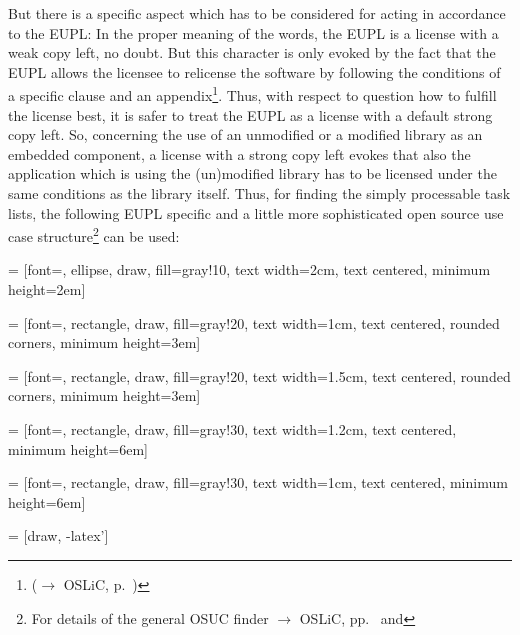 But there is a specific aspect which has to be considered for acting in
accordance to the EUPL: In the proper meaning of the words, the EUPL is a
license with a weak copy left, no doubt. But this character is only evoked by
the fact that the EUPL allows the licensee to relicense the software by
following the conditions of a specific clause and an
appendix\footnote{($\rightarrow$ OSLiC, p.\
\pageref{sec:ProtectingPowerOfEupl})}. Thus, with respect to question how to
fulfill the license best, it is safer to treat the EUPL as a license with a
default strong copy left. So, concerning the use of an unmodified or a modified
library as an embedded component, a license with a strong copy left evokes that
also the application which is using the (un)modified library has to be licensed
under the same conditions as the library itself. Thus, for finding the simply
processable task lists, the following EUPL specific and a little more
sophisticated open source use case structure\footnote{For details of the general
OSUC finder $\rightarrow$ OSLiC, pp.\ \pageref{OsucTokens} and
\pageref{OsucDefinitionTree}} can be used:
 
 
 
 = [font=\scriptsize, ellipse, draw, fill=gray!10, 
    text width=2cm, text centered, minimum height=2em]

 = [font=\tiny, rectangle, draw, fill=gray!20, 
    text width=1cm, text centered, rounded corners, minimum height=3em]

 = [font=\tiny, rectangle, draw, fill=gray!20, 
    text width=1.5cm, text centered, rounded corners, minimum height=3em]
    
 = [font=\tiny, rectangle, draw, fill=gray!30, 
    text width=1.2cm, text centered, minimum height=6em]

 = [font=\tiny, rectangle, draw, fill=gray!30, 
    text width=1cm, text centered, minimum height=6em]


 = [draw, -latex']


